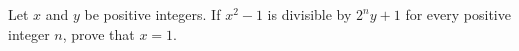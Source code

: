 Let $x$ and $y$ be positive integers. If $x^{2}-1$ is divisible by $2^{n}y+1$ for every positive integer $n$, prove that $x=1$.
